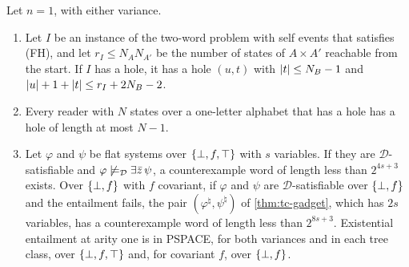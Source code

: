\begin{theorem}\label{thm:cx-unary}
Let $n=1$, with either variance.
\begin{enumerate}[leftmargin=*]
\item Let $I$ be an instance of the two-word problem with self events that
  satisfies (FH), and let $r_I\le N_AN_{A'}$ be the number of states of
  $A\times A'$ reachable from the start. If $I$ has a hole, it has a hole
  $(u,t)$ with $\lvert t\rvert\le N_B-1$ and $\lvert u\rvert+1+\lvert t\rvert\le r_I+2N_B-2$.
\item Every reader with $N$ states over a one-letter alphabet that has a hole
  has a hole of length at most $N-1$.
\item Let $\varphi$ and $\psi$ be flat systems over $\{\bot,f,\top\}$ with $s$ variables.
  If they are $\mathcal D$-satisfiable and
  $\varphi\not\models_{\mathcal D}\exists\bar z\,\psi$, a counterexample word of length
  less than $2^{4s+3}$ exists. Over $\{\bot,f\}$ with $f$ covariant, if $\varphi$ and
  $\psi$ are $\mathcal D$-satisfiable over $\{\bot,f\}$ and the entailment fails, the
  pair $(\varphi^\natural,\psi^\natural)$ of \cref{thm:tc-gadget}, which has $2s$
  variables, has a counterexample word of length less than $2^{8s+3}$.
  Existential entailment at arity one is in PSPACE, for both variances and in
  each tree class, over $\{\bot,f,\top\}$ and, for covariant $f$, over $\{\bot,f\}$.
\end{enumerate}
\end{theorem}

